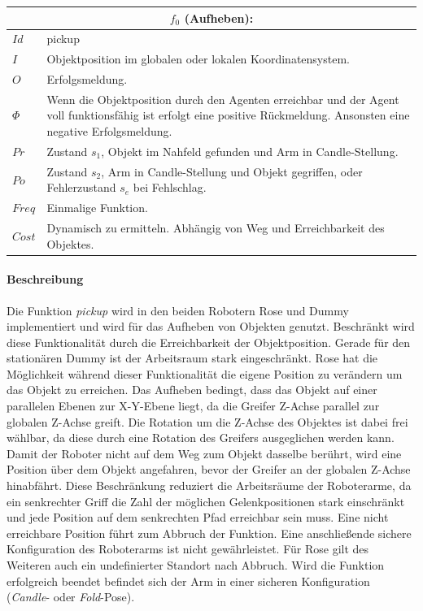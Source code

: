 \begin{tabular}{|p{3cm}|p{10cm}|}
	\multicolumn{2}{c}{	$f_0$ (Aufheben):}\\
	\hline  $Id$ & pickup\\ 
	\hline  $I$ & Objektposition im globalen oder lokalen Koordinatensystem. \\ 
	\hline  $O$ & Erfolgsmeldung. \\ 
	\hline  $\Phi$ & Wenn die Objektposition durch den Agenten erreichbar und der Agent voll funktionsfähig ist erfolgt eine positive Rückmeldung. Ansonsten eine negative Erfolgsmeldung.\\ 
	\hline $Pr$ & Zustand $s_1$, Objekt im Nahfeld gefunden und Arm in Candle-Stellung. \\ 
	\hline $Po$ & Zustand $s_2$, Arm in Candle-Stellung und Objekt gegriffen, oder Fehlerzustand $s_e$ bei Fehlschlag. \\ 
	\hline $Freq$ & Einmalige Funktion. \\ 
	\hline $Cost$ & Dynamisch zu ermitteln. Abhängig von Weg und Erreichbarkeit des Objektes. \\
	\hline
\end{tabular}

\paragraph{Beschreibung}
Die Funktion \textit{pickup} wird in den beiden Robotern Rose und Dummy implementiert und wird für das Aufheben von Objekten genutzt. Beschränkt wird diese Funktionalität durch die Erreichbarkeit der Objektposition. Gerade für den stationären Dummy ist der Arbeitsraum stark eingeschränkt. Rose hat die Möglichkeit während dieser Funktionalität die eigene Position zu verändern um das Objekt zu erreichen. Das Aufheben bedingt, dass das Objekt auf einer parallelen Ebenen zur X-Y-Ebene liegt, da die Greifer Z-Achse parallel zur globalen Z-Achse greift. Die Rotation um die Z-Achse des Objektes ist dabei frei wählbar, da diese durch eine Rotation des Greifers ausgeglichen werden kann. Damit der Roboter nicht auf dem Weg zum Objekt dasselbe berührt, wird eine Position über dem Objekt angefahren, bevor der Greifer an der globalen Z-Achse hinabfährt.  Diese Beschränkung reduziert die Arbeitsräume der Roboterarme, da ein senkrechter Griff die Zahl der möglichen Gelenkpositionen stark einschränkt und jede Position auf dem senkrechten Pfad erreichbar sein muss. Eine nicht erreichbare Position führt zum Abbruch der Funktion. Eine anschließende sichere Konfiguration des Roboterarms ist nicht gewährleistet. Für Rose gilt des Weiteren auch ein undefinierter Standort nach Abbruch. Wird die Funktion erfolgreich beendet befindet sich der Arm in einer sicheren Konfiguration (\textit{Candle}- oder \textit{Fold}-Pose).


